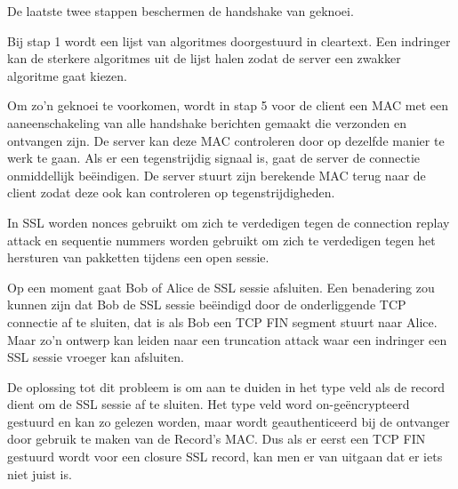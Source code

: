 \noindent De laatste twee stappen beschermen de handshake van geknoei.

\noindent Bij stap 1 wordt een lijst van algoritmes doorgestuurd in cleartext. Een indringer kan de sterkere algoritmes uit de lijst halen zodat de server een zwakker algoritme gaat kiezen. 

\noindent Om zo’n geknoei te voorkomen, wordt in stap 5 voor de client een MAC met een aaneenschakeling van alle handshake berichten gemaakt die verzonden en ontvangen zijn. De server kan deze MAC controleren door op dezelfde manier te werk te gaan. Als er een tegenstrijdig signaal is, gaat de server de connectie onmiddellijk beëindigen. De server stuurt zijn berekende MAC terug naar de client zodat deze ook kan controleren op tegenstrijdigheden.

\noindent In SSL worden nonces gebruikt om zich te verdedigen tegen de connection replay attack en sequentie nummers worden gebruikt om zich te verdedigen tegen het hersturen van pakketten tijdens een open sessie.


\noindent Op een moment gaat Bob of Alice de SSL sessie afsluiten. Een benadering zou kunnen zijn dat Bob de SSL sessie beëindigd door de onderliggende TCP connectie af te sluiten, dat is als Bob een TCP FIN segment stuurt naar Alice. Maar zo’n ontwerp kan leiden naar een truncation attack waar een indringer een SSL sessie vroeger kan afsluiten.

\noindent De oplossing tot dit probleem is om aan te duiden in het type veld als de record dient om de SSL sessie af te sluiten. Het type veld word on-geëncrypteerd gestuurd en kan zo gelezen worden, maar wordt geauthenticeerd bij de ontvanger door gebruik te maken van de Record’s MAC. Dus als er eerst een TCP FIN gestuurd wordt voor een closure SSL record, kan men er van uitgaan dat er iets niet juist is.

